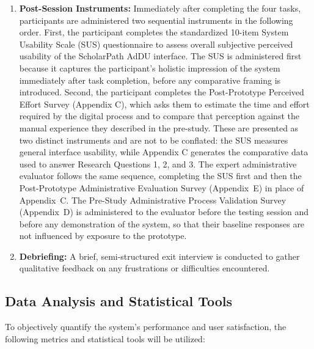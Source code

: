 \begin{enumerate}
  \item \textbf{Post-Session Instruments:} Immediately after completing the four tasks, participants are administered two sequential instruments in the following order. First, the participant completes the standardized 10-item System Usability Scale (SUS) questionnaire to assess overall subjective perceived usability of the ScholarPath AdDU interface. The SUS is administered first because it captures the participant's holistic impression of the system immediately after task completion, before any comparative framing is introduced. Second, the participant completes the Post-Prototype Perceived Effort Survey (Appendix C), which asks them to estimate the time and effort required by the digital process and to compare that perception against the manual experience they described in the pre-study. These are presented as two distinct instruments and are not to be conflated: the SUS measures general interface usability, while Appendix C generates the comparative data used to answer Research Questions 1, 2, and 3.
  The expert administrative evaluator follows the same sequence, completing
  the SUS first and then the Post-Prototype Administrative Evaluation
  Survey (Appendix~E) in place of Appendix~C. The Pre-Study Administrative
  Process Validation Survey (Appendix~D) is administered to the evaluator
  before the testing session and before any demonstration of the system,
  so that their baseline responses are not influenced by exposure to the
  prototype.
  \item \textbf{Debriefing:} A brief, semi-structured exit interview is conducted to gather qualitative feedback on any frustrations or difficulties encountered.
\end{enumerate}


\subsection{Data Analysis and Statistical Tools}

To objectively quantify the system's performance and user satisfaction, the following metrics and statistical tools will be utilized:

